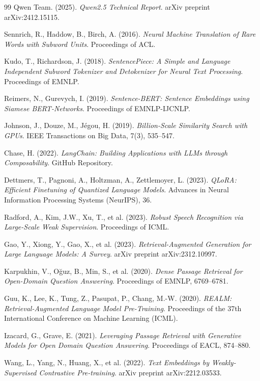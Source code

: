 \documentclass[12pt, a4paper]{report}
\begin{document}
\begin{thebibliography}{99}
Qwen Team. (2025). \textit{Qwen2.5 Technical Report}. arXiv preprint arXiv:2412.15115.

Sennrich, R., Haddow, B., Birch, A. (2016). \textit{Neural Machine Translation of Rare Words with Subword Units}. Proceedings of ACL.

Kudo, T., Richardson, J. (2018). \textit{SentencePiece: A Simple and Language Independent Subword Tokenizer and Detokenizer for Neural Text Processing}. Proceedings of EMNLP.

Reimers, N., Gurevych, I. (2019). \textit{Sentence-BERT: Sentence Embeddings using Siamese BERT-Networks}. Proceedings of EMNLP-IJCNLP.

Johnson, J., Douze, M., Jégou, H. (2019). \textit{Billion-Scale Similarity Search with GPUs}. IEEE Transactions on Big Data, 7(3), 535--547.

Chase, H. (2022). \textit{LangChain: Building Applications with LLMs through Composability}. GitHub Repository.

Dettmers, T., Pagnoni, A., Holtzman, A., Zettlemoyer, L. (2023). \textit{QLoRA: Efficient Finetuning of Quantized Language Models}. Advances in Neural Information Processing Systems (NeurIPS), 36.

Radford, A., Kim, J.W., Xu, T., et al. (2023). \textit{Robust Speech Recognition via Large-Scale Weak Supervision}. Proceedings of ICML.

Gao, Y., Xiong, Y., Gao, X., et al. (2023). \textit{Retrieval-Augmented Generation for Large Language Models: A Survey}. arXiv preprint arXiv:2312.10997.

Karpukhin, V., Oğuz, B., Min, S., et al. (2020). \textit{Dense Passage Retrieval for Open-Domain Question Answering}. Proceedings of EMNLP, 6769--6781.

Guu, K., Lee, K., Tung, Z., Pasupat, P., Chang, M.-W. (2020). \textit{REALM: Retrieval-Augmented Language Model Pre-Training}. Proceedings of the 37th International Conference on Machine Learning (ICML).

Izacard, G., Grave, E. (2021). \textit{Leveraging Passage Retrieval with Generative Models for Open Domain Question Answering}. Proceedings of EACL, 874--880.

Wang, L., Yang, N., Huang, X., et al. (2022). \textit{Text Embeddings by Weakly-Supervised Contrastive Pre-training}. arXiv preprint arXiv:2212.03533.


\end{thebibliography}
\end{document}
